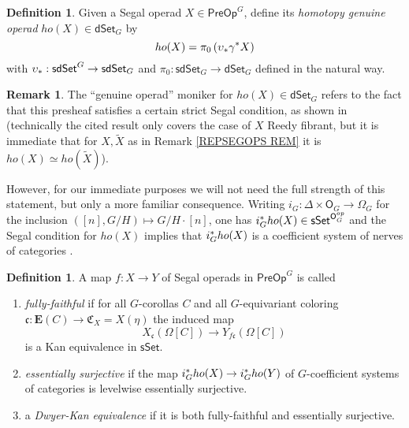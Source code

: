 \documentclass[a4paper,10pt
,draft
]{article}%
\numberwithin{equation}{section}
\numberwithin{figure}{section}
\theoremstyle{definition} %
\newtheorem{definition}[equation]{Definition}%
\newtheorem{remark}[equation]{Remark}%
\newcommand{\dSet}{\mathsf{dSet}}
\newcommand{\1}{\ensuremath{\mathbbm 1}}%
\begin{document}
\begin{definition}
	Given a Segal operad $X \in \mathsf{PreOp}^G$,
	define its \emph{homotopy genuine operad} $ho(X) \in \dSet_G$ by
\[
	ho(X) = \pi_0\left(\upsilon_{\**}\gamma^{\**}X\right)
\]
	with 
	$\upsilon_{\**}: \mathsf{sdSet}^G \to \mathsf{sdSet}_G$
	and 
	$\pi_0 \colon \mathsf{sdSet}_G \to \mathsf{dSet}_G$
	defined in the natural way. 
\end{definition}


\begin{remark}
	The ``genuine operad'' moniker for 
	$ho(X)\in \dSet_G$ refers to the fact that this presheaf satisfies a certain strict Segal condition, as shown in \cite[Prop. 5.9]{BP_edss}
	(technically the cited result only covers the case of $X$ Reedy fibrant, but it is immediate that for 
	$X,\widetilde{X}$ as in
	Remark \ref{REPSEGOPS REM} it is $ho(X) \simeq ho(\widetilde{X})$).
	
	However, for our immediate purposes we will not need the full strength of this statement, 
	but only a more familiar consequence.
	Writing
	$i_G \colon \Delta \times \mathsf{O}_G \to \Omega_G$
	for the inclusion
	$([n],G/H) \mapsto G/H \cdot [n]$,
	one has 
	$i_G^{\**}ho(X)
	\in \mathsf{sSet}^{\mathsf{O}_G^{op}}$
	and the Segal condition for $ho(X)$ implies that 
	$i_G^{\**}ho(X)$
	is a coefficient system of 
	nerves of categories \cite[Rmk. 5.11]{BP_edss}.
\end{remark}


\begin{definition}
      A map $f \colon X \to Y$ of Segal operads in $\mathsf{PreOp}^G$ is called
\begin{enumerate}[label = (\roman*)]
	\item \textit{fully-faithful} if for all $G$-corollas $C$ and all $G$-equivariant coloring
	$\mathfrak{c} \colon \boldsymbol{E}(C) \to
	\mathfrak{C}_X  =X(\eta)$
	the induced map
\[
	X_{\mathfrak{c}}(\Omega[C]) \to 
	Y_{f\mathfrak{c}}(\Omega[C])
\]
            is a Kan equivalence in $\mathsf{sSet}$.
      \item \textit{essentially surjective} if the map 
      $i_G^{\**}ho(X) \to i_G^{\**}ho(Y)$ of $G$-coefficient systems of categories
            is levelwise essentially surjective.
      \item a \textit{Dwyer-Kan equivalence} if it is both fully-faithful and essentially surjective.
      \end{enumerate}
\end{definition}
\end{document}
